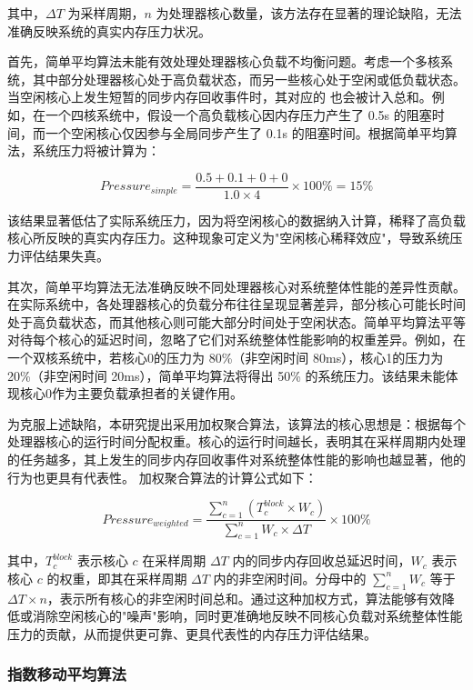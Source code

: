 其中，\(\Delta T\) 为采样周期，\(n\) 为处理器核心数量，该方法存在显著的理论缺陷，无法准确反映系统的真实内存压力状况。

首先，简单平均算法未能有效处理处理器核心负载不均衡问题。考虑一个多核系统，其中部分处理器核心处于高负载状态，而另一些核心处于空闲或低负载状态。当空闲核心上发生短暂的同步内存回收事件时，其对应的  也会被计入总和。例如，在一个四核系统中，假设一个高负载核心因内存压力产生了 0.5s 的阻塞时间，而一个空闲核心仅因参与全局同步产生了 0.1s 的阻塞时间。根据简单平均算法，系统压力将被计算为：

\[
Pressure_{simple} = \frac{0.5 + 0.1 + 0 + 0}{1.0 \times 4} \times 100\% = 15\%
\]

该结果显著低估了实际系统压力，因为将空闲核心的数据纳入计算，稀释了高负载核心所反映的真实内存压力。这种现象可定义为"空闲核心稀释效应"，导致系统压力评估结果失真。

其次，简单平均算法无法准确反映不同处理器核心对系统整体性能的差异性贡献。在实际系统中，各处理器核心的负载分布往往呈现显著差异，部分核心可能长时间处于高负载状态，而其他核心则可能大部分时间处于空闲状态。简单平均算法平等对待每个核心的延迟时间，忽略了它们对系统整体性能影响的权重差异。例如，在一个双核系统中，若核心0的压力为 80\%（非空闲时间 80ms），核心1的压力为 20\%（非空闲时间 20ms），简单平均算法将得出 50\% 的系统压力。该结果未能体现核心0作为主要负载承担者的关键作用。

为克服上述缺陷，本研究提出采用加权聚合算法，该算法的核心思想是：根据每个处理器核心的运行时间分配权重。核心的运行时间越长，表明其在采样周期内处理的任务越多，其上发生的同步内存回收事件对系统整体性能的影响也越显著，他的行为也更具有代表性。 加权聚合算法的计算公式如下：

\begin{equation}
    Pressure_{weighted} = \frac{\sum_{c=1}^{n} (T_c^{block} \times W_c)}{\sum_{c=1}^{n} W_c \times \Delta T} \times 100\%
\end{equation}

其中，\(T_c^{block}\) 表示核心 \(c\) 在采样周期 \(\Delta T\) 内的同步内存回收总延迟时间，\(W_c\) 表示核心 \(c\) 的权重，即其在采样周期 \(\Delta T\) 内的非空闲时间。分母中的 \(\sum_{c=1}^{n} W_c\) 等于 \(\Delta T \times n\)，表示所有核心的非空闲时间总和。通过这种加权方式，算法能够有效降低或消除空闲核心的"噪声"影响，同时更准确地反映不同核心负载对系统整体性能压力的贡献，从而提供更可靠、更具代表性的内存压力评估结果。

\subsubsection{指数移动平均算法}

